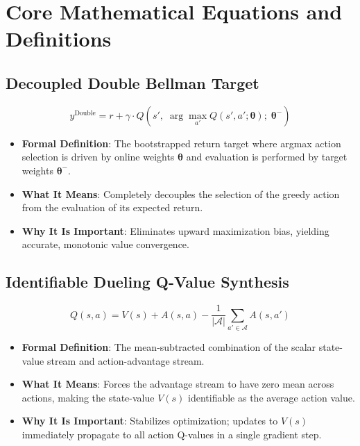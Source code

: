 \documentclass[11pt,a4paper]{article}
\theoremstyle{definition}
\begin{document}
\section{Core Mathematical Equations and Definitions}

\subsection{Decoupled Double Bellman Target}
{\boldmath
\begin{equation}
y^{\text{Double}} = r + \gamma \cdot Q\left( s', \; \arg\max_{a'} Q(s', a'; \boldsymbol{\theta}); \; \boldsymbol{\theta}^- \right)
\end{equation}
}
\begin{itemize}
    \item \textbf{Formal Definition}: The bootstrapped return target where argmax action selection is driven by online weights $\boldsymbol{\theta}$ and evaluation is performed by target weights $\boldsymbol{\theta}^-$.
    \item \textbf{What It Means}: Completely decouples the selection of the greedy action from the evaluation of its expected return.
    \item \textbf{Why It Is Important}: Eliminates upward maximization bias, yielding accurate, monotonic value convergence.
\end{itemize}

\subsection{Identifiable Dueling Q-Value Synthesis}
{\boldmath
\begin{equation}
Q(s, a) = V(s) + A(s, a) - \frac{1}{|\mathcal{A}|} \sum_{a' \in \mathcal{A}} A(s, a')
\end{equation}
}
\begin{itemize}
    \item \textbf{Formal Definition}: The mean-subtracted combination of the scalar state-value stream and action-advantage stream.
    \item \textbf{What It Means}: Forces the advantage stream to have zero mean across actions, making the state-value $V(s)$ identifiable as the average action value.
    \item \textbf{Why It Is Important}: Stabilizes optimization; updates to $V(s)$ immediately propagate to all action Q-values in a single gradient step.
\end{itemize}
\end{document}
